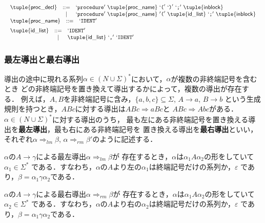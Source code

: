 \documentclass[a4j,dvipdfmx]{jbook}
\begin{document}
\[\begin{array}{l}
\begin{array}{rcl}
  \tuple{\mathsf{proc\_decl}} & \mathtt{::=} & `\texttt{procedure}'\ \tuple{\mathsf{proc\_name}}\ `\texttt{(}'\ `\texttt{)}'\ `\texttt{;}'\ \tuple{\mathsf{inblock}}\\
  & | & `\texttt{procedure}'\ \tuple{\mathsf{proc\_name}}\ '\texttt{(}'\ \tuple{\mathsf{id\_list}}\ `\texttt{;}'\ \tuple{\mathsf{inblock}}\\ 
\end{array}\\[5pt]
\begin{array}{rcl}
  \tuple{\mathsf{proc\_name}} & \mathtt{::=} & `\texttt{IDENT}'
\end{array}\\[5pt]
\begin{array}{rcl}
  \tuple{\mathsf{id\_list}} & \mathtt{::=} & `\texttt{IDENT}'\\
  & | & \tuple{\mathsf{id\_list}}\ `\texttt{,}'\ `\texttt{IDENT}'
\end{array}
\end{array}\]

\subsubsection{最左導出と最右導出}

導出の途中に現れる系列$\alpha\in(N\cup\Sigma)^\ast$において，$\alpha$が複数の非終端記号を含むとき
どの非終端記号を置き換えて導出するかによって，複数の導出が存在する．
例えば，$A,B$を非終端記号に含み，$\{a,b,c\}\subseteq\Sigma$, $A\rightarrow a$, $B\rightarrow b$
という生成規則を持つとき，$ABc$に対する導出は$ABc\Rightarrow aBc$と
$ABc\Rightarrow Abc$がある．$\alpha\in(N\cup\Sigma)^\ast$に対する導出のうち，
最も左にある非終端記号を置き換える導出を{\bf 最左導出}，最も右にある非終端記号を
置き換える導出を{\bf 最右導出}といい，それぞれ$\alpha\Rightarrow_{lm}\beta$,
$\alpha\Rightarrow_{rm}\beta'$のように記述する．

$\alpha$の$A\rightarrow\gamma$による最左導出$\alpha\Rightarrow_{lm}\beta$が
存在するとき，$\alpha$は$\alpha_1 A\alpha_2$の形をしていて$\alpha_1\in\Sigma^\ast$
である．すなわち，$\alpha$の$A$より左の$\alpha_1$は終端記号だけの系列か，$\varepsilon$
であり，$\beta=\alpha_1\gamma\alpha_2$である．

$\alpha$の$A\rightarrow\gamma$による最右導出$\alpha\Rightarrow_{rm}\beta$が
存在するとき，$\alpha$は$\alpha_1 A\alpha_2$の形をしていて$\alpha_2\in\Sigma^\ast$
である．すなわち，$\alpha$の$A$より右の$\alpha_2$は終端記号だけの系列か，$\varepsilon$
であり，$\beta=\alpha_1\gamma\alpha_2$である．
\end{document}
